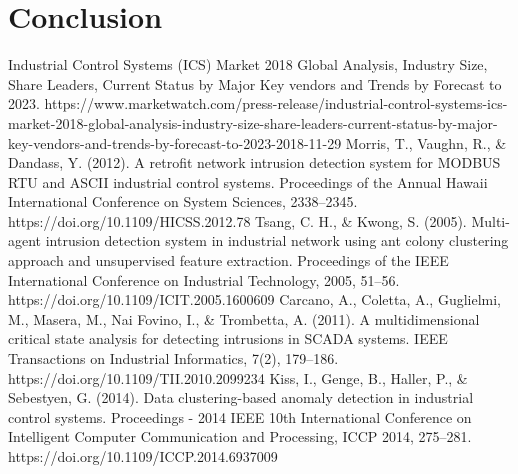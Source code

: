 \documentclass[conference]{IEEEtran}
\begin{document}
\section{Conclusion}




\begin{thebibliography}{00}
Industrial Control Systems (ICS) Market 2018 Global Analysis, Industry Size, Share Leaders, Current Status by Major Key vendors and Trends by Forecast to 2023. https://www.marketwatch.com/press-release/industrial-control-systems-ics-market-2018-global-analysis-industry-size-share-leaders-current-status-by-major-key-vendors-and-trends-by-forecast-to-2023-2018-11-29
Morris, T., Vaughn, R., \& Dandass, Y. (2012). A retrofit network intrusion detection system for MODBUS RTU and ASCII industrial control systems. Proceedings of the Annual Hawaii International Conference on System Sciences, 2338–2345. https://doi.org/10.1109/HICSS.2012.78
Tsang, C. H., \& Kwong, S. (2005). Multi-agent intrusion detection system in industrial network using ant colony clustering approach and unsupervised feature extraction. Proceedings of the IEEE International Conference on Industrial Technology, 2005, 51–56. https://doi.org/10.1109/ICIT.2005.1600609
Carcano, A., Coletta, A., Guglielmi, M., Masera, M., Nai Fovino, I., \& Trombetta, A. (2011). A multidimensional critical state analysis for detecting intrusions in SCADA systems. IEEE Transactions on Industrial Informatics, 7(2), 179–186. https://doi.org/10.1109/TII.2010.2099234
Kiss, I., Genge, B., Haller, P., & Sebestyen, G. (2014). Data clustering-based anomaly detection in industrial control systems. Proceedings - 2014 IEEE 10th International Conference on Intelligent Computer Communication and Processing, ICCP 2014, 275–281. https://doi.org/10.1109/ICCP.2014.6937009
\end{thebibliography}
\vspace{12pt}
\end{document}
